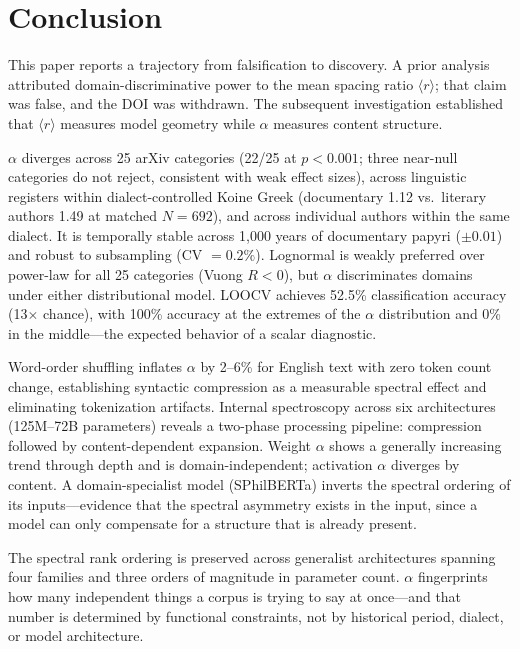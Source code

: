 \documentclass[12pt,letterpaper]{article}
\newcommand{\rbar}{\langle r \rangle}
\newcommand{\al}{\alpha}
\begin{document}
\section{Conclusion}
\label{sec:conclusion}

This paper reports a trajectory from falsification to discovery.
A prior analysis attributed domain-discriminative power to the mean
spacing ratio $\rbar$; that claim was false, and the DOI was
withdrawn.  The subsequent investigation established that $\rbar$
measures model geometry while $\al$ measures content structure.

$\al$ diverges across 25 arXiv categories (22/25 at $p < 0.001$;
three near-null categories do not reject, consistent with weak
effect sizes), across linguistic registers within dialect-controlled
Koine Greek (documentary 1.12 vs.\ literary authors 1.49 at matched
$N = 692$), and across individual authors within the same dialect.
It is temporally stable across 1{,}000 years of documentary papyri
($\pm 0.01$) and robust to subsampling (CV $= 0.2\%$).  Lognormal
is weakly preferred over power-law for all 25 categories (Vuong
$R < 0$), but $\al$ discriminates domains under either distributional
model.  LOOCV achieves 52.5\%
classification accuracy (13$\times$ chance), with 100\% accuracy at
the extremes of the $\al$ distribution and 0\% in the middle---the
expected behavior of a scalar diagnostic.

Word-order shuffling inflates $\al$ by 2--6\% for English text with
zero token count change, establishing syntactic compression as a
measurable spectral effect and eliminating tokenization artifacts.
Internal spectroscopy across six architectures (125M--72B
parameters) reveals a two-phase processing pipeline: compression
followed by content-dependent expansion.  Weight $\al$ shows a
generally increasing trend through depth and is domain-independent;
activation $\al$ diverges by content.  A domain-specialist model
(SPhilBERTa) inverts the spectral ordering of its inputs---evidence
that the spectral asymmetry exists in the input, since a model can
only compensate for a structure that is already present.

The spectral rank ordering is preserved across generalist
architectures spanning four families and three orders of magnitude
in parameter count.  $\al$ fingerprints how many independent things
a corpus is trying to say at once---and that number is determined
by functional constraints, not by historical period, dialect, or
model architecture.
\end{document}
